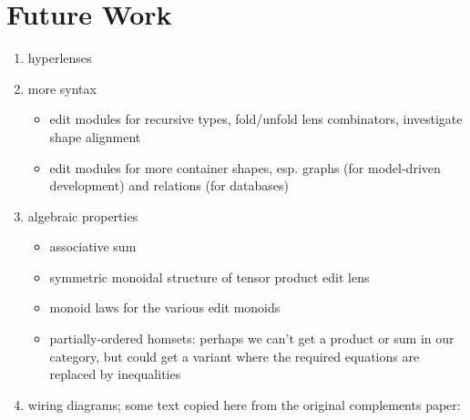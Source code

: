 \section{Future Work}
\label{sec:future}

\begin{enumerate}
    \item hyperlenses
    \item more syntax
        \begin{itemize}
            \item edit modules for recursive types, fold/unfold lens combinators,
                investigate shape alignment
            \item edit modules for more container shapes, esp. graphs (for
                model-driven development) and relations (for databases)
        \end{itemize}
    \item algebraic properties
        \begin{itemize}
            \item associative sum
            \item symmetric monoidal structure of tensor product edit lens
            \item monoid laws for the various edit monoids
            \item partially-ordered homsets: perhaps we can't get a product or sum
                in our category, but could get a variant where the required
                equations are replaced by inequalities
        \end{itemize}
    \item wiring diagrams; some text copied here from the original
        complements paper:


\end{enumerate}
